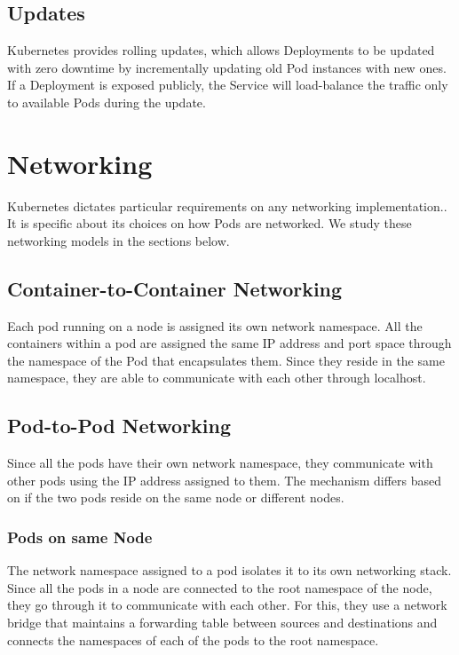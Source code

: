 \documentclass[sigconf]{acmart}
\begin{document}
\subsection{Updates}
Kubernetes provides rolling updates, which allows Deployments to be updated with zero downtime by incrementally updating old Pod instances with new ones. If a Deployment is exposed publicly, the Service will load-balance the traffic only to available Pods during the update.

\section{Networking}

Kubernetes dictates particular requirements on any networking implementation.\cite{KubernetesNetworking}. It is specific about its choices on how Pods are networked. We study these networking models in the sections below.


\subsection{Container-to-Container Networking}
Each pod running on a node is assigned its own network namespace. All the containers within a pod are assigned the same IP address and port space through the namespace of the Pod that encapsulates them. Since they reside in the same namespace, they are able to communicate with each other through localhost.

\subsection{Pod-to-Pod Networking}
Since all the pods have their own network namespace, they communicate with other pods using the IP address assigned to them. The mechanism differs based on if the two pods reside on the same node or different nodes.

\subsubsection{Pods on same Node}

The network namespace assigned to a pod isolates it to its own networking stack. Since all the pods in a node are connected to the root namespace of the node, they go through it to communicate with each other. For this, they use a network bridge that maintains a forwarding table between sources and destinations and connects the namespaces of each of the pods to the root namespace.
\end{document}
